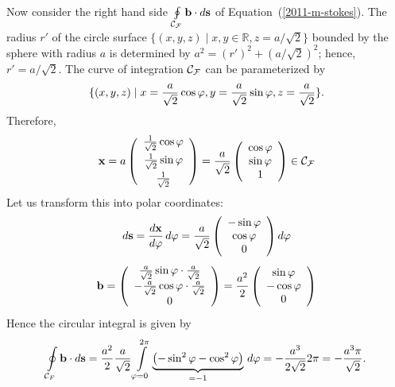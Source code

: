 {\begin{enumerate}
Now consider the right hand side $\oint \limits_{{\cal C}_{\cal F}} {\bf b} \cdot d{\bf s}$
of Equation~(\ref{2011-m-stokes}).
The radius $r'$ of the circle  surface
$\{(x,y,z) \mid x,y \in \mathbb{R} ,z=a/\sqrt{2}\}$ bounded by the sphere with radius $a$
is determined by
$ a^2 =(r')^2 +(a/ \sqrt{2})^2$; hence, $r' =a/\sqrt{2}$.
The curve of integration ${\cal C}_{\cal F}$ can be parameterized by
$$\{(x,y,z) \mid
x={a\over \sqrt{2}} \cos \varphi,
y={a\over \sqrt{2}} \sin \varphi,
z={a\over \sqrt{2}}\}.$$
Therefore,
$$
  {\bf x} = a
  \left(
    \begin{array}{c}
      \frac{1}{\sqrt2}\cos\varphi \\[1ex]
      \frac{1}{\sqrt2}\sin\varphi \\[1ex]
      \frac{1}{\sqrt2}
    \end{array}
  \right)=
  \frac{a}{\sqrt{2}}
  \left(
    \begin{array}{c}
      \cos\varphi \\
      \sin\varphi \\
      1
    \end{array}
  \right)
\in {\cal C}_{\cal F}
$$
Let us transform this into polar coordinates:
$$
  d{\bf s}=\frac{d{\bf x}}{d\varphi} \,d\varphi =
  \frac{a}{\sqrt{2}}
  \left(
    \begin{array}{c}
      -\sin\varphi \\
      \cos\varphi \\
      0
    \end{array}
  \right) d\varphi
$$
$$
  {\bf b}=
  \left(
    \begin{array}{c}
      \frac{a}{\sqrt{2}}\sin\varphi\cdot\frac{a}{\sqrt{2}} \\
      -\frac{a}{\sqrt{2}}\cos\varphi\cdot\frac{a}{\sqrt{2}} \\
      0
    \end{array}
  \right)=
  \frac{a^2}{2}
  \left(
    \begin{array}{c}
      \sin\varphi \\
      -\cos\varphi \\
      0
    \end{array}
  \right)
$$
Hence the circular integral is given by
$$
  \oint \limits_{{\cal C}_F} {\bf b} \cdot d{\bf s}=
  \frac{a^2}{2}\frac{a}{\sqrt{2}}
  \int \limits_{\varphi=0}^{2 \pi}
  \underbrace
    {\left(-\sin^2\varphi-\cos^2\varphi\right)}
  _{=-1}
  \, d\varphi =
  -\frac{a^3}{2\sqrt{2}}2 \pi=-\frac{a^3 \pi}{\sqrt{2}}
.
$$



\end{enumerate}}
